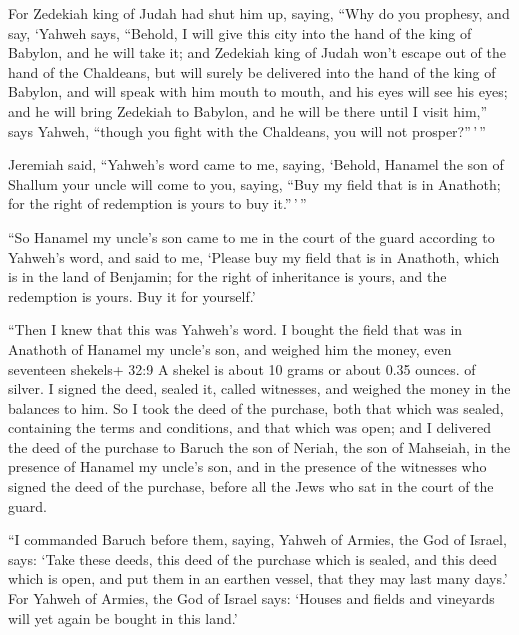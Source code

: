  For Zedekiah king of Judah had shut him up, saying, ``Why
do you prophesy, and say, `Yahweh says, ``Behold, I will give this city
into the hand of the king of Babylon, and he will take it; 
and Zedekiah king of Judah won't escape out of the hand of the
Chaldeans, but will surely be delivered into the hand of the king of
Babylon, and will speak with him mouth to mouth, and his eyes will see
his eyes;  and he will bring Zedekiah to Babylon, and he
will be there until I visit him,'' says Yahweh, ``though you fight with
the Chaldeans, you will not prosper?''\,'\,''

 Jeremiah said, ``Yahweh's word came to me, saying,
 `Behold, Hanamel the son of Shallum your uncle will come to
you, saying, ``Buy my field that is in Anathoth; for the right of
redemption is yours to buy it.''\,'\,''

 ``So Hanamel my uncle's son came to me in the court of the
guard according to Yahweh's word, and said to me, `Please buy my field
that is in Anathoth, which is in the land of Benjamin; for the right of
inheritance is yours, and the redemption is yours. Buy it for yourself.'

``Then I knew that this was Yahweh's word.  I bought the
field that was in Anathoth of Hanamel my uncle's son, and weighed him
the money, even seventeen shekels+ 32:9 A shekel is about 10 grams or
about 0.35 ounces. of silver.  I signed the deed, sealed
it, called witnesses, and weighed the money in the balances to him.
 So I took the deed of the purchase, both that which was
sealed, containing the terms and conditions, and that which was open;
 and I delivered the deed of the purchase to Baruch the son
of Neriah, the son of Mahseiah, in the presence of Hanamel my uncle's
son, and in the presence of the witnesses who signed the deed of the
purchase, before all the Jews who sat in the court of the guard.

 ``I commanded Baruch before them, saying, 
Yahweh of Armies, the God of Israel, says: `Take these deeds, this deed
of the purchase which is sealed, and this deed which is open, and put
them in an earthen vessel, that they may last many days.' 
For Yahweh of Armies, the God of Israel says: `Houses and fields and
vineyards will yet again be bought in this land.'

